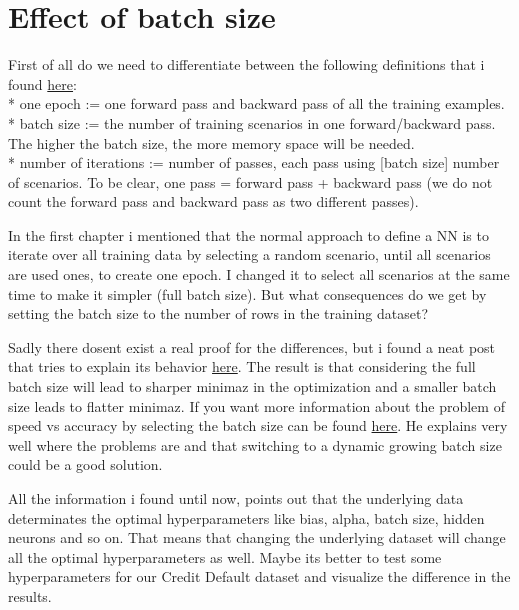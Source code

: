 \documentclass[
]{book}
\begin{document}
\hypertarget{effect-of-batch-size}{%
\chapter{Effect of batch size}\label{effect-of-batch-size}}

First of all do we need to differentiate between the following definitions that i found \href{https://stackoverflow.com/questions/4752626/epoch-vs-iteration-when-training-neural-networks}{here}:\\
* one epoch := one forward pass and backward pass of all the training examples.\\
* batch size := the number of training scenarios in one forward/backward pass. The higher the batch size, the more memory space will be needed.\\
* number of iterations := number of passes, each pass using {[}batch size{]} number of scenarios. To be clear, one pass = forward pass + backward pass (we do not count the forward pass and backward pass as two different passes).

In the first chapter i mentioned that the normal approach to define a NN is to iterate over all training data by selecting a random scenario, until all scenarios are used ones, to create one epoch. I changed it to select all scenarios at the same time to make it simpler (full batch size). But what consequences do we get by setting the batch size to the number of rows in the training dataset?

Sadly there dosent exist a real proof for the differences, but i found a neat post that tries to explain its behavior \href{https://stats.stackexchange.com/questions/164876/what-is-the-trade-off-between-batch-size-and-number-of-iterations-to-train-a-neu}{here}. The result is that considering the full batch size will lead to sharper minimaz in the optimization and a smaller batch size leads to flatter minimaz. If you want more information about the problem of speed vs accuracy by selecting the batch size can be found \href{https://medium.com/mini-distill/effect-of-batch-size-on-training-dynamics-21c14f7a716e}{here}. He explains very well where the problems are and that switching to a dynamic growing batch size could be a good solution.

All the information i found until now, points out that the underlying data determinates the optimal hyperparameters like bias, alpha, batch size, hidden neurons and so on. That means that changing the underlying dataset will change all the optimal hyperparameters as well. Maybe its better to test some hyperparameters for our Credit Default dataset and visualize the difference in the results.
\end{document}
